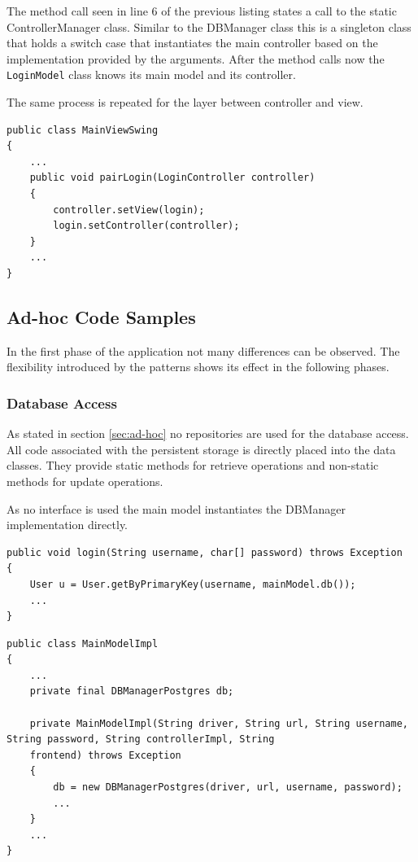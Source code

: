 The method call seen in line 6 of the previous listing states a call to the static ControllerManager class. Similar to the DBManager class this is a singleton class that holds a switch case that instantiates the main controller based on the implementation provided by the arguments. After the method calls now the \texttt{LoginModel} class knows its main model and its controller. 

The same process is repeated for the layer between controller and view. 

\begin{lstlisting}
public class MainViewSwing
{
	...
	public void pairLogin(LoginController controller)
	{
		controller.setView(login);
		login.setController(controller);
	}
	...
}
\end{lstlisting}
   

\subsection{Ad-hoc Code Samples}
In the first phase of the application not many differences can be observed. The flexibility introduced by the patterns shows its effect in the following phases. 

\subsubsection{Database Access}
As stated in section \ref{sec:ad-hoc} no repositories are used for the database access. All code associated with the persistent storage is directly placed into the data classes. They provide static methods for retrieve operations and non-static methods for update operations. 

As no interface is used the main model instantiates the DBManager implementation directly. 

\begin{lstlisting}
public void login(String username, char[] password) throws Exception
{
	User u = User.getByPrimaryKey(username, mainModel.db());
	...
}
\end{lstlisting}

\begin{lstlisting}
public class MainModelImpl
{
	...
	private final DBManagerPostgres db;
	
	private MainModelImpl(String driver, String url, String username, String password, String controllerImpl, String
	frontend) throws Exception
	{
		db = new DBManagerPostgres(driver, url, username, password);
		...
	}
	...
}
\end{lstlisting}

